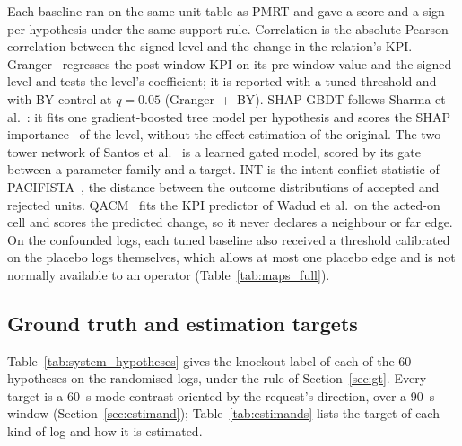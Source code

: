 Each baseline ran on the same unit table as PMRT and gave a score and a sign per hypothesis under the same support rule.
Correlation is the absolute Pearson correlation between the signed level and the change in the relation's KPI.
Granger~\cite{granger1969causal} regresses the post-window KPI on its pre-window value and the signed level and tests
the level's coefficient; it is reported with a tuned threshold and with BY control at $q = 0.05$ (Granger~+~BY).
SHAP-GBDT follows Sharma et al.~\cite{Sharma_2025}: it fits one gradient-boosted tree model per hypothesis and scores
the SHAP importance~\cite{lundberg2017shap} of the level, without the effect estimation of the original. The two-tower
network of Santos et al.~\cite{santos2026conflictairan} is a learned gated model, scored by its gate between a parameter
family and a target. INT is the intent-conflict statistic of PACIFISTA~\cite{PACIFISTA}, the distance between the
outcome distributions of accepted and rejected units. QACM~\cite{QACM2024} fits the KPI predictor of Wadud et al.\ on
the acted-on cell and scores the predicted change, so it never declares a neighbour or far edge. On the confounded logs,
each tuned baseline also received a threshold calibrated on the placebo logs themselves, which allows at most one
placebo edge and is not normally available to an operator (Table~\ref{tab:maps_full}).

\subsection{Ground truth and estimation targets}
\label{app:ko_labels}
\label{app:estimands}

Table~\ref{tab:system_hypotheses} gives the knockout label of each of the 60 hypotheses on the randomised logs, under
the rule of Section~\ref{sec:gt}. Every target is a 60~s mode contrast oriented by the request's direction, over a
90~s window (Section~\ref{sec:estimand}); Table~\ref{tab:estimands} lists the target of each kind of log and how it is
estimated.

